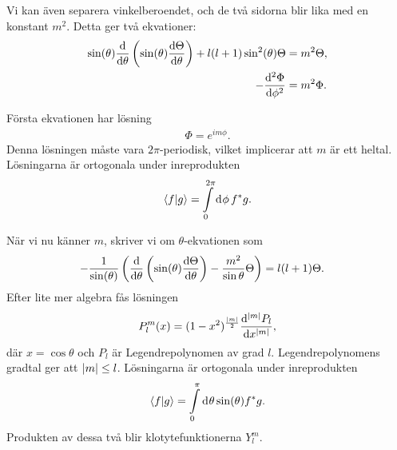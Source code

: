 Vi kan även separera vinkelberoendet, och de två sidorna blir lika med en konstant $m^{2}$. Detta ger två ekvationer:
\begin{align*}
	\sin(\theta)\dv{\theta}\left(\sin(\theta)\dv{\Theta}{\theta}\right) + l(l + 1)\sin[2](\theta)\Theta          &= m^{2}\Theta, \\
	-\dv[2]{\Phi}{\phi} &= m^{2}\Phi.
\end{align*}

Första ekvationen har lösning
\begin{align*}
	\Phi = e^{im\phi}.
\end{align*}
Denna lösningen måste vara $2\pi$-periodisk, vilket implicerar att $m$ är ett heltal. Lösningarna är ortogonala under inreprodukten
\begin{align*}
	\braket{f}{g} = \int\limits_{0}^{2\pi}\dd[]{\phi}f^{*}g.
\end{align*}

När vi nu känner $m$, skriver vi om $\theta$-ekvationen som
\begin{align*}
	-\frac{1}{\sin(\theta)}\left(\dv{\theta}\left(\sin(\theta)\dv{\Theta}{\theta}\right) - \frac{m^{2}}{\sin{\theta}}\Theta\right) &= l(l + 1)\Theta.
\end{align*}
Efter lite mer algebra fås lösningen
\begin{align*}
	P_{l}^{m}(x) = (1 - x^{2})^{\frac{\abs{m}}{2}}\dv[\abs{m}]{P_{l}}{x},
\end{align*}
där $x = \cos{\theta}$ och $P_{l}$ är Legendrepolynomen av grad $l$. Legendrepolynomens gradtal ger att $\abs{m}\leq l$. Lösningarna är ortogonala under inreprodukten
\begin{align*}
	\braket{f}{g} = \int\limits_{0}^{\pi}\dd[]{\theta}\sin(\theta)f^{*}g.
\end{align*}
Produkten av dessa två blir klotytefunktionerna $Y_{l}^{m}$.

